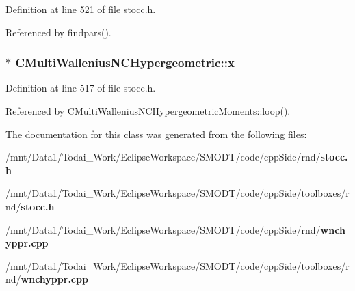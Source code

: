 Definition at line 521 of file stocc.\-h.



Referenced by findpars().

\subsubsection[{x}]{ $\ast$ C\-Multi\-Wallenius\-N\-C\-Hypergeometric\-::x\hspace{0.3cm}{\ttfamily [protected]}}\label{class_c_multi_wallenius_n_c_hypergeometric_ae4e4bd1bd6ffec0956195da6cf893f76}


Definition at line 517 of file stocc.\-h.



Referenced by C\-Multi\-Wallenius\-N\-C\-Hypergeometric\-Moments\-::loop().



The documentation for this class was generated from the following files\-:\begin{DoxyCompactItemize}
\item 
/mnt/\-Data1/\-Todai\-\_\-\-Work/\-Eclipse\-Workspace/\-S\-M\-O\-D\-T/code/cpp\-Side/rnd/{\bf stocc.\-h}\item 
/mnt/\-Data1/\-Todai\-\_\-\-Work/\-Eclipse\-Workspace/\-S\-M\-O\-D\-T/code/cpp\-Side/toolboxes/rnd/{\bf stocc.\-h}\item 
/mnt/\-Data1/\-Todai\-\_\-\-Work/\-Eclipse\-Workspace/\-S\-M\-O\-D\-T/code/cpp\-Side/rnd/{\bf wnchyppr.\-cpp}\item 
/mnt/\-Data1/\-Todai\-\_\-\-Work/\-Eclipse\-Workspace/\-S\-M\-O\-D\-T/code/cpp\-Side/toolboxes/rnd/{\bf wnchyppr.\-cpp}\end{DoxyCompactItemize}
